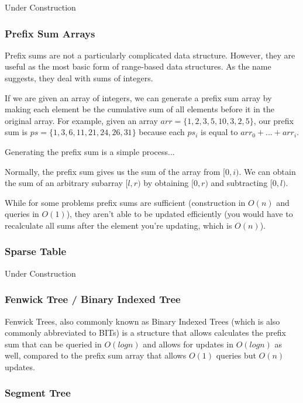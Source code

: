 Under Construction

\subsubsection{Prefix Sum Arrays}

Prefix sums are not a particularly complicated data structure. However, they are useful as the most basic form of range-based data structures. As the name suggests, they deal with sums of integers.

If we are given an array of integers, we can generate a prefix sum array by making each element be the cumulative sum of all elements before it in the original array. For example, given an array $arr = \{1,2,3,5,10,3,2,5\}$, our prefix sum is $ps = \{1,3,6,11,21,24,26,31\}$ because each $ps_i$ is equal to $arr_0 + ... + arr_i$.

Generating the prefix sum is a simple process...

Normally, the prefix sum gives us the sum of the array from $[0,i)$. We can obtain the sum of an arbitrary subarray $[l,r)$ by obtaining $[0,r)$ and subtracting $[0,l)$. 

While for some problems prefix sums are sufficient (construction in $O(n)$ and queries in $O(1)$), they aren't able to be updated efficiently (you would have to recalculate all sums after the element you're updating, which is $O(n)$).

\subsubsection{Sparse Table}

Under Construction

\subsubsection{Fenwick Tree / Binary Indexed Tree}
 

Fenwick Trees, also commonly known as Binary Indexed Trees (which is also commonly abbreviated to BITs) is a structure that allows calculates the prefix sum that can be queried in $O(log n)$ and allows for updates in $O(log n)$ as well, compared to the prefix sum array that allows $O(1)$ queries but $O(n)$ updates.

\subsubsection{Segment Tree}

